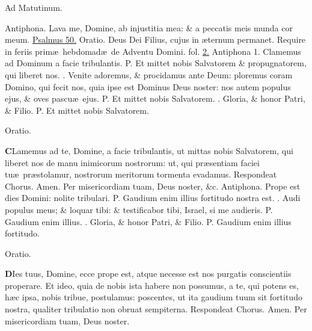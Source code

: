 \documentclass[letter,11pt]{book}
\makeatletter
\DeclareRobustCommand{\Vbar}{\vers@resp{-0.1em}{V}}
\newcommand{\vers@resp@sym}{\raisebox{0.2ex}{\rotatebox[origin=c]{-20}{$\m@th\rceil$}}}
\newcommand{\vers@resp}[2]{%
  {\ooalign{\hidewidth\kern#1\vers@resp@sym\hidewidth\cr#2\cr}}%
}%
\def\P{\color{Red} P. \color{black}}
\def\V{\color{Red} \Vbar . \color{black}}
\makeatother
\begin{document}
\begin{multicols}{2}
\begin{center}
\color{Red} Ad Matutinum.
\end{center} \vspace{-.5em}
\par \noindent \color{Red} Antiphona. \color{black} Lava me, Domine, ab injustitia mea: \& a peccatis meis munda cor meum. \color{Red} \hyperlink{ps50}{Psalmus 50.} Oratio. \color{black} Deus Dei Filius, cujus
in \ae ternum permanet. \color{Red} Require in feriis prim\ae \ hebdomad\ae \ de Adventu Domini. fol. \color{black} \hyperlink{page.2}{2.}
\newline \color{Red} Antiphona 1. \color{black} Clamemus ad Dominum a facie tribulantis. \P Et mittet nobis Salvatorem \& propugnatorem, qui liberet nos. \V Venite adoremus, \& procidamus ante Deum: ploremus coram Domino, qui fecit nos, quia ipse est Dominus Deus noster: nos autem populus ejus, \& oves pascu\ae \ ejus. \P Et mittet nobis Salvatorem. \V Gloria, \& honor Patri, \& Filio. \P Et mittet nobis Salvatorem.
\vspace{-.5em} \begin{center} \color{Red} Oratio. \color{black} \end{center} \vspace{-.5em}
\lettrine[lines=2]{\bfseries \color{Red} C}{}Lamemus ad te, Domine, a facie tribulantis, ut mittas nobis Salvatorem, qui liberet nos de manu inimicorum nostrorum: ut, qui pr\ae sentiam faciei tu\ae \ pr\ae stolamur, nostrorum meritorum tormenta evadamus. \color{Red} Respondeat Chorus. \color{black} Amen. Per misericordiam tuam, Deus noster, \color{Red} \&c. \color{black}
\newline \color{Red} Antiphona. \color{black} Prope est dies Domini: nolite tribulari. \P Gaudium enim illius fortitudo nostra est. \V Audi populus meus; \& loquar tibi: \& testificabor tibi, Israel, si me audieris. \P Gaudium enim illius. \V Gloria, \& honor Patri, \& Filio. \P Gaudium enim illius fortitudo.
\vspace{-.5em} \begin{center} \color{Red} Oratio. \color{black} \end{center} \vspace{-.5em}
\lettrine[lines=2]{\bfseries \color{Red} D}{}Ies tuus, Domine, ecce prope est, atque necesse est nos purgatis conscientiis properare. Et ideo, quia de nobis ista habere non possumus, a te, qui potens es, h\ae c ipsa, nobis tribue, postulamus: poscentes, ut ita gaudium tuum sit fortitudo nostra, qualiter tribulatio non obruat sempiterna. \color{Red} Respondeat Chorus. \color{black} Amen. Per misericordiam tuam, Deus noster.

\end{multicols}
\end{document}

